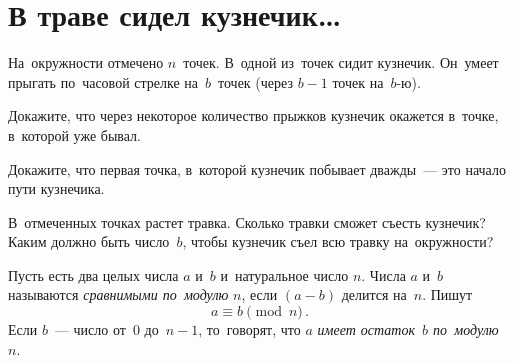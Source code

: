 
\section*{В траве сидел кузнечик\ldots}





На~окружности отмечено $n$~точек.
В~одной из~точек сидит кузнечик.
Он~умеет прыгать по~часовой стрелке на~$b$~точек (через $b-1$ точек на~$b$-ю).

\begin{problems}

Докажите, что через некоторое количество прыжков кузнечик окажется в~точке,
в~которой уже бывал.

\item
Докажите, что первая точка, в~которой кузнечик побывает дважды~--- это начало
пути кузнечика.

\item
В~отмеченных точках растет травка.
Сколько травки сможет съесть кузнечик?
Каким должно быть число~$b$, чтобы кузнечик съел всю травку на~окружности?

\end{problems}

Пусть есть два целых числа $a$ и~$b$ и~натуральное число $n$.
Числа $a$ и~$b$ называются \emph{сравнимыми по~модулю} $n$, если
$(a - b)$ делится на~$n$.
Пишут
\[
    a \equiv b \pmod n
\,.\]
Если $b$~--- число от~$0$ до~$n - 1$, то~говорят, что $a$
\emph{имеет остаток~$b$ по~модулю~$n$}.


